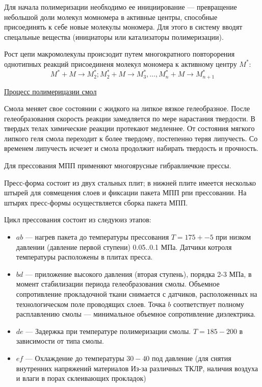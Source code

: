 \documentclass{article}
\begin{document}
Для начала полимеризации необходимо ее инициирование --- превращение небольшой доли молекул момномера в активные центры, способные присоединять к себе новые молекулы мономера. Для этого в систему вводят спецальные вещества (инициаторы или катализаторы полимеризации).

Рост цепи макромолекулы происзодит путем многократного повторорения однотипных реакций присоединеня молекул мономера к активному центру $M^*$:
$$
M^* + M \to M_2^*; M_2^* + M \to M_3^*, \dots , M_n^* + M \to M_{n+1}^*
$$

\underline{Процесс полимерицазии смол} 

Смола меняет свое состоянии с жидкого на липкое вязкое гелеобразное. После гелеобразования скорость реакции замедляется по мере нарастания твердости. В твердых телах химические реакции протекают медленнее. От состояния мягкого липкого геля смола переходит к более твердому, постепенно теряя липучесть. Со временем липучесть исчезет и смола продолжит набирать твердость и прочность.

Для прессования МПП применяют многоярусные гибравлиечкие прессы.

Пресс-форма состоит из двух стальных плит; в нижней плите имеется несколько штырей для совмещения слоев и фиксации пакета МПП рпи прессовании. На штырях пресс-формы осуществляется сборка пакета МПП.

Цикл прессования состоит из следуюиз этапов:

\begin{itemize}
	\item $ab$ --- нагрев пакета до температуры прессования $T = 175 +- 5$ при низком давлении (давление первой ступени) 0.05..0.1 МПа. Датчики котроля температуры расположены в плитах пресса.
	\item $bd$ --- приложение высокого давления (вторая ступень), порядка 2-3 МПа, в момент стабилизации периода гелеобразования смолы. Объемное сопротивление прокладочной ткани снимается с датчиков, расположенных на технологическом поле проводящих слоев. Точка $b$ соответствует полному расплавлению смолы --- минимальное объемное сопротивление диэлектрика.
	\item $de$ --- Задержка при температуре полимеризации смолы. $T = 185-200$ в зависимости от типа смолы.
	\item $ef$ --- Охлаждение до температуры $30-40$ под давление (для снятия внутренних напряжений материалов Из-за различных ТКЛР, наличия воздуха и влаги в порах склеивающих прокладок)
\end{itemize}
\end{document}
